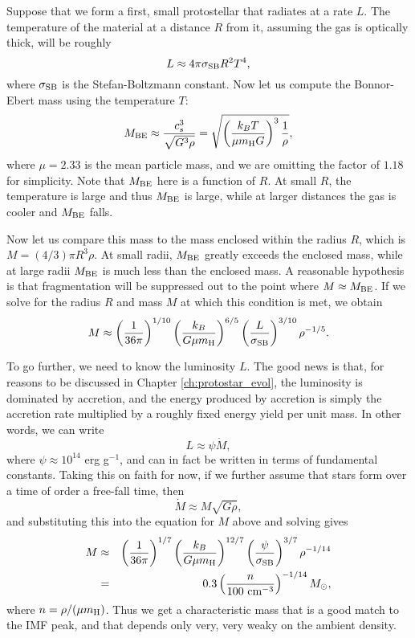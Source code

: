Suppose that we form a first, small protostellar that radiates at a rate $L$. The temperature of the material at a distance $R$ from it, assuming the gas is optically thick, will be roughly
\begin{equation}
L \approx 4 \pi \sigma_{\rm SB} R^2 T^4,
\end{equation}
where $\sigma_{\rm SB}$ is the Stefan-Boltzmann constant. Now let us compute the Bonnor-Ebert mass using the temperature $T$:
\begin{equation}
M_{\rm BE} \approx \frac{c_s^3}{\sqrt{G^3\rho}} = \sqrt{\left(\frac{k_B T}{\mu m_{\rm H} G}\right)^3 \frac{1}{\rho}},
\end{equation}
where $\mu=2.33$ is the mean particle mass, and we are omitting the factor of $1.18$ for simplicity. Note that $M_{\rm BE}$ here is a function of $R$. At small $R$, the temperature is large and thus $M_{\rm BE}$ is large, while at larger distances the gas is cooler and $M_{\rm BE}$ falls.

Now let us compare this mass to the mass enclosed within the radius $R$, which is $M=(4/3)\pi R^3 \rho$. At small radii, $M_{\rm BE}$ greatly exceeds the enclosed mass, while at large radii $M_{\rm BE}$ is much less than the enclosed mass. A reasonable hypothesis is that fragmentation will be suppressed out to the point where $M \approx M_{\rm BE}$. If we solve for the radius $R$ and mass $M$ at which this condition is met, we obtain
\begin{equation}
M  \approx \left(\frac{1}{36\pi}\right)^{1/10} \left(\frac{k_B}{G \mu m_{\rm H}}\right)^{6/5} \left(\frac{L}{\sigma_{\rm SB}}\right)^{3/10} \rho^{-1/5}.
\end{equation}

To go further, we need to know the luminosity $L$. The good news is that, for reasons to be discussed in Chapter \ref{ch:protostar_evol}, the luminosity is dominated by accretion, and the energy produced by accretion is simply the accretion rate multiplied by a roughly fixed energy yield per unit mass. In other words, we can write
\begin{equation}
L \approx \psi \dot{M},
\end{equation}
where $\psi \approx 10^{14}$ erg g$^{-1}$, and can in fact be written in terms of fundamental constants. Taking this on faith for now, if we further assume that stars form over a time of order a free-fall time, then
\begin{equation}
\dot{M} \approx M \sqrt{G\rho},
\end{equation}
and substituting this into the equation for $M$ above and solving gives
\begin{eqnarray}
M & \approx & \left(\frac{1}{36\pi}\right)^{1/7} \left(\frac{k_B}{G \mu m_{\rm H}}\right)^{12/7} \left(\frac{\psi}{\sigma_{\rm SB}}\right)^{3/7} \rho^{-1/14} \\
& = & 0.3 \left(\frac{n}{100\mbox{ cm}^{-3}}\right)^{-1/14} M_\odot,
\end{eqnarray}
where $n = \rho/(\mu m_{\rm H})$. Thus we get a characteristic mass that is a good match to the IMF peak, and that depends only very, very weaky on the ambient density.

